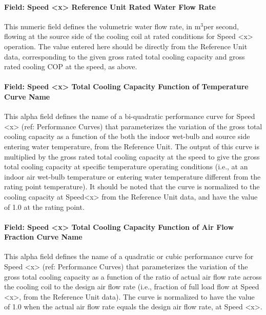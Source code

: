 \paragraph{Field: Speed \textless{}x\textgreater{} Reference Unit Rated Water Flow Rate}\label{field-speed-x-reference-unit-rated-water-flow-rate}

This numeric field defines the volumetric water flow rate, in m\(^{3}\)per second, flowing at the source side of the cooling coil at rated conditions for Speed \textless{}x\textgreater{} operation. The value entered here should be directly from the Reference Unit data, corresponding to the given gross rated total cooling capacity and gross rated cooling COP at the speed, as above.

\paragraph{Field: Speed \textless{}x\textgreater{} Total Cooling Capacity Function of Temperature Curve Name}\label{field-speed-x-total-cooling-capacity-function-of-temperature-curve-name-2}

This alpha field defines the name of a bi-quadratic performance curve for Speed \textless{}x\textgreater{} (ref: Performance Curves) that parameterizes the variation of the gross total cooling capacity as a function of the both the indoor wet-bulb and source side entering water temperature, from the Reference Unit. The output of this curve is multiplied by the gross rated total cooling capacity at the speed to give the gross total cooling capacity at specific temperature operating conditions (i.e., at an indoor air wet-bulb temperature or entering water temperature different from the rating point temperature). It should be noted that the curve is normalized to the cooling capacity at Speed\textless{}x\textgreater{} from the Reference Unit data, and have the value of 1.0 at the rating point.

\paragraph{Field: Speed \textless{}x\textgreater{} Total Cooling Capacity Function of Air Flow Fraction Curve Name}\label{field-speed-x-total-cooling-capacity-function-of-air-flow-fraction-curve-name-1}

This alpha field defines the name of a quadratic or cubic performance curve for Speed \textless{}x\textgreater{} (ref: Performance Curves) that parameterizes the variation of the gross total cooling capacity as a function of the ratio of actual air flow rate across the cooling coil to the design air flow rate (i.e., fraction of full load flow at Speed \textless{}x\textgreater{}, from the Reference Unit data). The curve is normalized to have the value of 1.0 when the actual air flow rate equals the design air flow rate, at Speed \textless{}x\textgreater{}.

